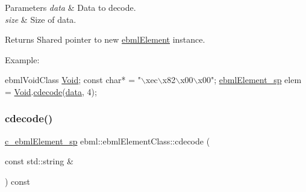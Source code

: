 \begin{DoxyParams}{Parameters}
{\em data} & Data to decode. \\
\hline
{\em size} & Size of \textquotesingle{}data\textquotesingle{}. \\
\hline
\end{DoxyParams}
\begin{DoxyReturn}{Returns}
Shared pointer to new \mbox{\hyperlink{classebml_1_1ebmlElement}{ebml\+Element}} instance.
\end{DoxyReturn}
Example\+: 
\begin{DoxyCode}
ebmlVoidClass \mbox{\hyperlink{namespaceebml_afbfd509d1cb71e416a07253746e886e9}{Void}};
\textcolor{keyword}{const} \textcolor{keywordtype}{char}* = \textcolor{stringliteral}{"\(\backslash\)xec\(\backslash\)x82\(\backslash\)x00\(\backslash\)x00"};
\mbox{\hyperlink{namespaceebml_adad533b7705a16bb360fe56380c5e7be}{ebmlElement\_sp}} elem = \mbox{\hyperlink{namespaceebml_afbfd509d1cb71e416a07253746e886e9}{Void}}.\mbox{\hyperlink{classebml_1_1ebmlElementClass_ad44d7844db705e5e1d8c35a780b58486}{cdecode}}(\mbox{\hyperlink{namespaceebml_ab21f8b4ff85186f670f17e84a02d9740}{data}}, 4);
\end{DoxyCode}
 \mbox{\label{classebml_1_1ebmlElementClass_a2696f361d3cf6f1f544657266ad21808}} 
\subsubsection{\texorpdfstring{cdecode()}{cdecode()}\hspace{0.1cm}{\footnotesize\ttfamily [4/6]}}
{\footnotesize\ttfamily \mbox{\hyperlink{namespaceebml_a2deef4e8071531b32e3533f1bf978917}{c\+\_\+ebml\+Element\+\_\+sp}} ebml\+::ebml\+Element\+Class\+::cdecode (\begin{DoxyParamCaption}\item[{const std\+::string \&}]{ }\end{DoxyParamCaption}) const}

\mbox{\label{classebml_1_1ebmlElementClass_a01de47338b3df5a666b989d9d85fa1d5}} 
